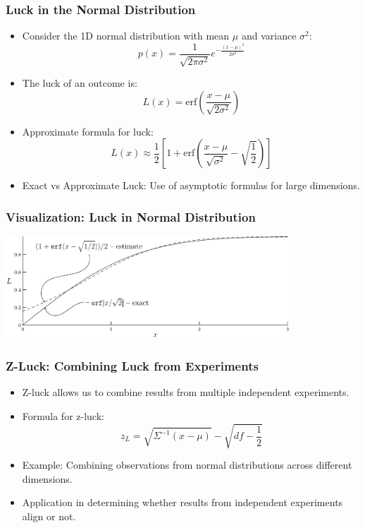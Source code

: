 \documentclass{beamer}
\begin{document}
\begin{frame}
\frametitle{Luck in the Normal Distribution}
\begin{itemize}
    \item Consider the 1D normal distribution with mean \(\mu\) and variance \(\sigma^2\):
    \[
    p(x) = \frac{1}{\sqrt{2\pi \sigma^2}} e^{-\frac{(x - \mu)^2}{2\sigma^2}}
    \]
    \item The luck of an outcome is:
    \[
    L(x) = \text{erf}\left(\frac{x - \mu}{\sqrt{2\sigma^2}}\right)
    \]
    \item Approximate formula for luck:
    \[
    L(x) \approx \frac{1}{2} \left[ 1 + \text{erf}\left( \frac{x - \mu}{\sqrt{\sigma^2}} - \sqrt{\frac{1}{2}} \right) \right]
    \]
    \item Exact vs Approximate Luck: Use of asymptotic formulas for large dimensions.
\end{itemize}
\end{frame}

\begin{frame}
\frametitle{Visualization: Luck in Normal Distribution}
\begin{center}
    \includegraphics[width=0.8\textwidth]{graphics/normal1.pdf}
\end{center}
\end{frame}

\begin{frame}
\frametitle{Z-Luck: Combining Luck from Experiments}
\begin{itemize}
    \item Z-luck allows us to combine results from multiple independent experiments.
    \item Formula for z-luck:
    \[
    z_L = \sqrt{\Sigma^{-1}(x - \mu)} - \sqrt{df - \frac{1}{2}}
    \]
    \item Example: Combining observations from normal distributions across different dimensions.
    \item Application in determining whether results from independent experiments align or not.
\end{itemize}
\end{frame}
\end{document}

